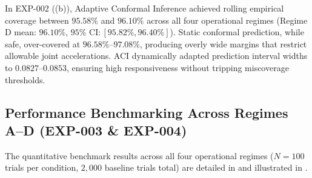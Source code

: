 In EXP-002 ((b)), Adaptive Conformal Inference achieved rolling empirical coverage between $95.58\%$ and $96.10\%$ across all four operational regimes (Regime D mean: $96.10\%$, $95\%\text{ CI}: [95.82\%, 96.40\%]$). Static conformal prediction, while safe, over-covered at $96.58\%\text{--}97.08\%$, producing overly wide margins that restrict allowable joint accelerations. ACI dynamically adapted prediction interval widths to $0.0827\text{--}0.0853$, ensuring high responsiveness without tripping miscoverage thresholds.

\subsection{Performance Benchmarking Across Regimes A–D (EXP-003 \& EXP-004)}
The quantitative benchmark results across all four operational regimes ($N = 100$ trials per condition, $2,000$ baseline trials total) are detailed in  and illustrated in .

